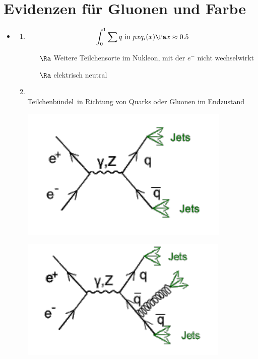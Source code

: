 \section{Evidenzen für Gluonen und Farbe}
\begin{itemize}
\item {}
\begin{enumerate}
\item {}
\begin{align}
\int_0^1 \sum{q \text{ in } p } x q_i (x) \Pa x \approx 0.5
\end{align}
\begin{itemize}
\item[$\Ra$] Weitere \glqq Teilchensorte\grqq{} im Nukleon, mit der $e^-$ nicht wechselwirkt
\item[$\Ra$] elektrisch neutral
\end{itemize}
\item {}\\
\glqq Teilchenbündel\grqq\ in Richtung von Quarks oder Gluonen im Endzustand

\begin{minipage}[c]{.39\textwidth}
\captionsetup{type=figure}
\includegraphics[width=\textwidth]{imgs/ep5-fig-7-4.pdf}
\end{minipage}
\begin{minipage}[c]{.39\textwidth}
\captionsetup{type=figure}
\includegraphics[width=\textwidth]{imgs/ep5-fig-7-5.pdf}
\end{minipage}


\end{enumerate}
\end{itemize}
